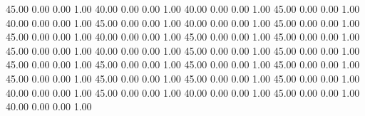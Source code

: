    45.00   0.00   0.00   1.00
   40.00   0.00   0.00   1.00
   40.00   0.00   0.00   1.00
   45.00   0.00   0.00   1.00
   40.00   0.00   0.00   1.00
   45.00   0.00   0.00   1.00
   40.00   0.00   0.00   1.00
   45.00   0.00   0.00   1.00
   45.00   0.00   0.00   1.00
   40.00   0.00   0.00   1.00
   45.00   0.00   0.00   1.00
   45.00   0.00   0.00   1.00
   45.00   0.00   0.00   1.00
   40.00   0.00   0.00   1.00
   45.00   0.00   0.00   1.00
   45.00   0.00   0.00   1.00
   45.00   0.00   0.00   1.00
   45.00   0.00   0.00   1.00
   45.00   0.00   0.00   1.00
   45.00   0.00   0.00   1.00
   45.00   0.00   0.00   1.00
   45.00   0.00   0.00   1.00
   45.00   0.00   0.00   1.00
   45.00   0.00   0.00   1.00
   40.00   0.00   0.00   1.00
   45.00   0.00   0.00   1.00
   40.00   0.00   0.00   1.00
   45.00   0.00   0.00   1.00
   40.00   0.00   0.00   1.00